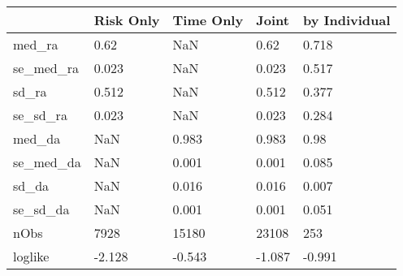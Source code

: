 \begin{tabular}{lllll}
& Risk Only & Time Only & Joint & by Individual \\ 
\hline 
med_ra & 0.62 & NaN & 0.62 & 0.718 \\ 
se_med_ra & 0.023 & NaN & 0.023 & 0.517 \\ 
sd_ra & 0.512 & NaN & 0.512 & 0.377 \\ 
se_sd_ra & 0.023 & NaN & 0.023 & 0.284 \\ 
med_da & NaN & 0.983 & 0.983 & 0.98 \\ 
se_med_da & NaN & 0.001 & 0.001 & 0.085 \\ 
sd_da & NaN & 0.016 & 0.016 & 0.007 \\ 
se_sd_da & NaN & 0.001 & 0.001 & 0.051 \\ 
nObs & 7928 & 15180 & 23108 & 253 \\ 
loglike & -2.128 & -0.543 & -1.087 & -0.991 \\ 
\hline 
\end{tabular}